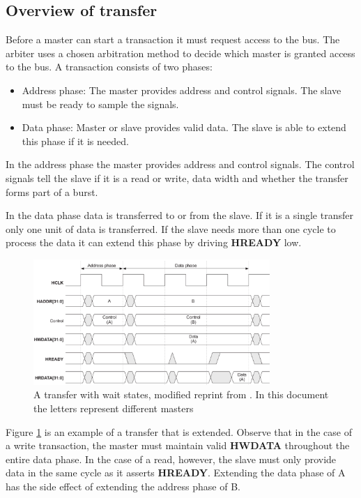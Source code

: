 \subsection{Overview of transfer}
Before a master can start a transaction it must request access to the bus. The arbiter uses a chosen arbitration method to decide which master is granted access
to the bus. A transaction consists of two phases: \\
\begin{itemize}
 \item Address phase: The master provides address and control signals. The slave must be ready to sample the signals. 
 \item Data phase: Master or slave provides valid data. The slave is able to extend this phase if it is needed. 
\end{itemize}

In the address phase the master provides address and control signals. The control signals tell the slave if it is a read or write, data width and whether the
transfer forms part of a burst. \par
In the data phase data is transferred to or from the slave. If it is a single transfer only one unit of data is transferred. If the slave needs more than
one cycle to process the data it can extend this phase by driving \textbf{HREADY} low. 

\begin{figure}[hbt]
    \begin{center}
        \includegraphics[width=0.8\textwidth]{figs/AHB/transfer.png}
    \end{center}
    \caption{A transfer with wait states, modified reprint from \cite{amba}. In this document the letters represent different masters}
    \label{fig:transfer}
\end{figure}

Figure \ref{fig:transfer} is an example of a transfer that is extended. Observe that in the case of a write transaction, the master must maintain valid \textbf{HWDATA} throughout the entire data phase. In the case of a read, however, the slave must only provide data in the same cycle as it asserts \textbf{HREADY}. Extending the data phase of A has the side effect of extending the address phase of B.  



